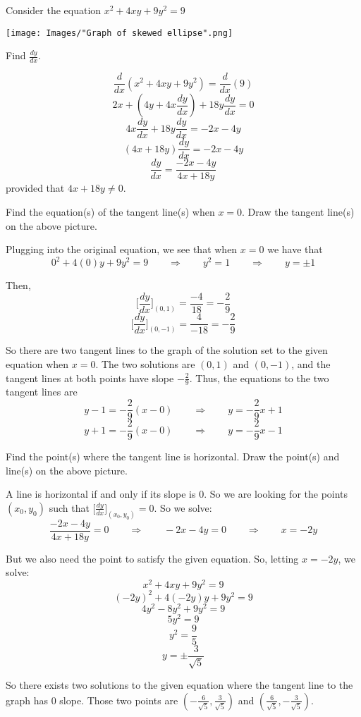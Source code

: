 \documentclass[handout,nooutcomes]{ximera}
\renewenvironment{freeResponse}{
\ifhandout\setbox0\vbox\bgroup\else
\begin{trivlist}\item[\hskip \labelsep\bfseries Solution:\hspace{2ex}]
\fi}
{\ifhandout\egroup\else
\end{trivlist}
\fi}
\newcommand{\dd}[2][]{\frac{d #1}{d #2}}
\newcommand{\ddx}{\frac{d}{dx}}
\newcommand{\eval}[1]{\bigg[ #1 \bigg]}
\begin{document}
\begin{problem}
  Consider the equation $x^2 + 4xy + 9y^2 = 9$
  \begin{image}
    \texttt{[image: Images/"Graph of skewed ellipse".png]}
  \end{image}
  \begin{enumerate}
    \item  Find $\dd[y]{x}$.
		\begin{freeResponse}
		$$ \ddx(x^2 + 4xy + 9y^2) = \ddx(9) $$
		$$ 2x + \left(4y + 4x \dd[y]{x} \right) + 18 y \dd[y]{x} = 0 $$
		$$ 4x \dd[y]{x} + 18y \dd[y]{x} = -2x - 4y $$
		$$ (4x+18y) \dd[y]{x} = -2x-4y $$
		$$ \dd[y]{x} = \frac{-2x-4y}{4x+18y} $$
		provided that $4x+18y \neq 0$.
		\end{freeResponse}
		
		
    \item  Find the equation(s) of the tangent line(s) when $x=0$.  Draw the tangent line(s) on the above picture.
		\begin{freeResponse}
		Plugging into the original equation, we see that when $x=0$ we have that 
		$$ 0^2 + 4(0)y + 9y^2 = 9 \qquad \Longrightarrow \qquad y^2 = 1 \qquad \Longrightarrow \qquad y = \pm 1 $$
		
		Then,
		$$\eval{\dd[y]{x}}_{(0,1)} = \frac{-4}{18} = -\frac{2}{9}$$
		$$\eval{\dd[y]{x}}_{(0,-1)} = \frac{4}{-18} = -\frac{2}{9} $$
		
		So there are two tangent lines to the graph of the solution set to the given equation when $x=0$.  The two solutions are $(0,1)$ and $(0,-1)$, and the tangent lines at both points have slope $-\frac{2}{9}$.  Thus, the equations to the two tangent lines are
		$$ y - 1 = -\frac{2}{9}(x-0)  \qquad \Longrightarrow \qquad y = -\frac{2}{9}x + 1 $$
		$$ y + 1 = -\frac{2}{9}(x-0) \qquad \Longrightarrow \qquad y = -\frac{2}{9}x - 1 $$
		\end{freeResponse}
		

    \item  Find the point(s) where the tangent line is horizontal.  Draw the point(s) and line(s) on the above picture.
		\begin{freeResponse}
		A line is horizontal if and only if its slope is 0.  So we are looking for the points $(x_0,y_0)$ such that $\eval{\dd[y]{x}}_{(x_0,y_0)} = 0$.  So we solve:
		$$ \frac{-2x-4y}{4x+18y} = 0\qquad \Longrightarrow \qquad -2x - 4y = 0 \qquad \Longrightarrow \qquad x=-2y$$
		
		But we also need the point to satisfy the given equation.  So, letting $x=-2y$, we solve:
		$$x^2 + 4xy + 9y^2 = 9 $$
		$$ (-2y)^2 + 4(-2y)y + 9y^2 = 9 $$
		$$ 4y^2 - 8y^2 + 9y^2 = 9 $$
		$$ 5y^2 = 9 $$
		$$ y^2 = \frac{9}{5} $$
		$$ y = \pm \frac{3}{\sqrt{5}} $$
		
		So there exists two solutions to the given equation where the tangent line to the graph has 0 slope.  Those two points are $\left( -\frac{6}{\sqrt{5}}, \frac{3}{\sqrt{5}} \right)$ and $\left( \frac{6}{\sqrt{5}}, - \frac{3}{\sqrt{5}} \right)$.
		\end{freeResponse}
	\end{enumerate}
\end{problem}
\end{document}
